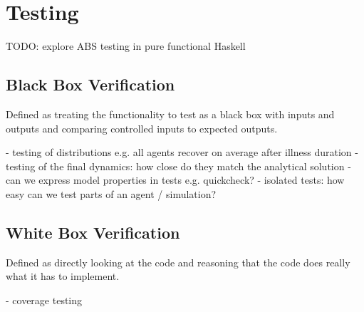 \section{Testing}
TODO: explore ABS testing in pure functional Haskell


\subsection{Black Box Verification}
Defined as treating the functionality to test as a black box with inputs and outputs and comparing controlled inputs to expected outputs.

- testing of distributions e.g. all agents recover on average after illness duration
- testing of the final dynamics: how close do they match the analytical solution
- can we express model properties in tests e.g. quickcheck?
- isolated tests: how easy can we test parts of an agent / simulation?

\subsection{White Box Verification}
Defined as directly looking at the code and reasoning that the code does really what it has to implement.

- coverage testing